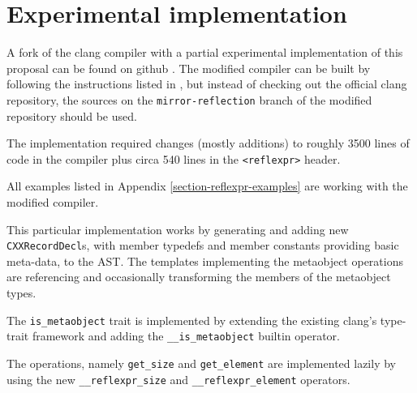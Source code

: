 \section{Experimental implementation}

A fork of the clang compiler with a partial experimental implementation
of this proposal can be found on github \cite{clang-reflexpr-impl}.
The modified compiler can be built by following the instructions listed
in \cite{clang-getting-started}, but instead of checking out the official clang
repository, the sources on the \texttt{mirror-reflection} branch of the modified
repository should be used.

The implementation required changes (mostly additions) to roughly 3500 lines
of code in the compiler plus circa 540 lines in the \texttt{<reflexpr>} header.

All examples listed in Appendix \ref{section-reflexpr-examples} are working with
the modified compiler.

This particular implementation works by generating and adding new \texttt{CXXRecordDecl}s,
with member typedefs and member constants providing basic meta-data, to the AST.
The templates implementing the metaobject operations are referencing and
occasionally transforming the members of the metaobject types.

The \texttt{is\_metaobject} trait is implemented by extending the existing
clang's type-trait framework and adding the \texttt{\_\_is\_metaobject} builtin
operator.

The  operations, namely \texttt{get\_size} and
\texttt{get\_element} are implemented lazily by using the new
\texttt{\_\_reflexpr\_size} and \texttt{\_\_reflexpr\_element} operators.
